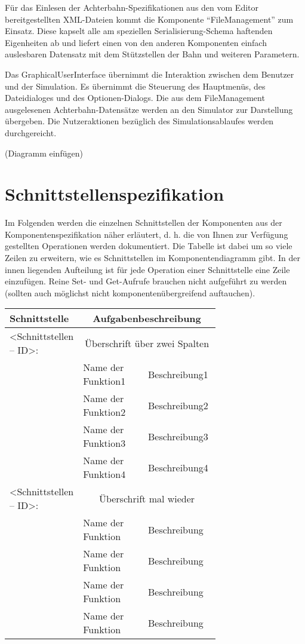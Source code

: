 Für das Einlesen der Achterbahn-Spezifikationen aus den vom Editor bereitgestellten
XML-Dateien kommt die Komponente ``FileManagement'' zum Einsatz. Diese kapselt alle
am speziellen Serialisierung-Schema haftenden Eigenheiten ab und liefert einen
von den anderen Komponenten einfach auslesbaren Datensatz mit dem Stützstellen der
Bahn und weiteren Parametern.

Das GraphicalUserInterface übernimmt die Interaktion zwischen dem Benutzer und
der Simulation. Es übernimmt die Steuerung des Hauptmenüs, des Dateidialoges und
des Optionen-Dialogs. Die aus dem FileManagement ausgelesenen Achterbahn-Datensätze
werden an den Simulator zur Darstellung übergeben. Die Nutzeraktionen bezüglich des
Simulationsablaufes werden durchgereicht.

(Diagramm einfügen)

\section{Schnittstellenspezifikation}

Im Folgenden werden die einzelnen Schnittstellen der Komponenten aus der
Komponentenspezifikation näher erläutert, d. h. die von Ihnen zur Verfügung
gestellten Operationen werden dokumentiert. Die Tabelle ist dabei um so viele
Zeilen zu erweitern, wie es Schnittstellen im Komponentendiagramm gibt. In der
innen liegenden Aufteilung ist für jede Operation einer Schnittstelle eine
Zeile einzufügen.  Reine Set- und Get-Aufrufe brauchen nicht aufgeführt zu
werden (sollten auch möglichst nicht komponentenübergreifend auftauchen).

\begin{tabular}[ht]{|l|p{0.35\linewidth}|p{0.35\linewidth}|}
 \hline
 Schnittstelle & \multicolumn{2}{|c|}{Aufgabenbeschreibung}\\
 \hline\hline
    <Schnittstellen – ID>: & \multicolumn{2}{|c|}{Überschrift über zwei Spalten}\\
 \hline
 & Name der Funktion1 & Beschreibung1\\ 
 & Name der Funktion2 & Beschreibung2\\ 
 & Name der Funktion3 & Beschreibung3\\ 
 & Name der Funktion4 & Beschreibung4\\ 
\hline
    <Schnittstellen – ID>: & \multicolumn{2}{|c|}{Überschrift mal wieder}\\
 \hline
 & Name der Funktion & Beschreibung\\ 
 & Name der Funktion & Beschreibung\\ 
 & Name der Funktion & Beschreibung\\ 
 & Name der Funktion & Beschreibung\\ 
 \hline
   \end{tabular}





